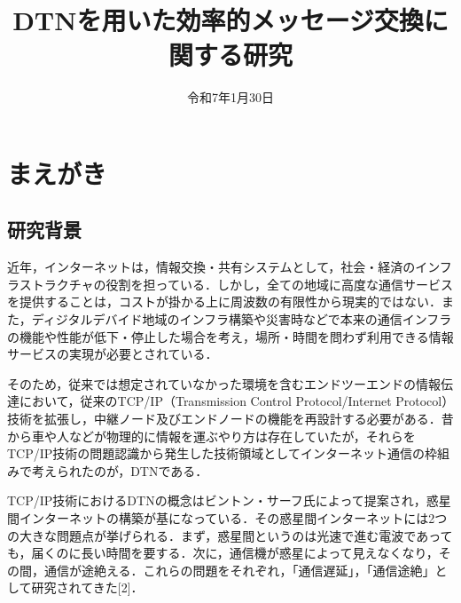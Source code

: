 \documentclass[11pt]{icsthesis}
\title{DTNを用いた効率的メッセージ交換に関する研究}
\date{令和7年1月30日}
\begin{document}
\maketitle
\pagestyle{fancy}
\fancyhead[R]{\nouppercase{\fontsize{10.5pt}{0pt}\selectfont\rightmark}}
\fancyhead[L]{\nouppercase{\fontsize{10.5pt}{0pt}\selectfont\leftmark}}
\fancyfoot[C]{--\ \thepage\ --}
\renewcommand{\headrulewidth}{0.3truemm}
\setcounter{tocdepth}{4}
\pagestyle{fancy}
\fancyfoot[C]{--\ \thepage\ --}
{\makeatletter
\let\ps@jpl@in\ps@empty
\makeatother
\pagestyle{plain}
\tableofcontents
\clearpage}

\chapter{まえがき}
\section{研究背景}
近年，インターネットは，情報交換・共有システムとして，社会・経済のインフラストラクチャの役割を担っている．しかし，全ての地域に高度な通信サービスを提供することは，コストが掛かる上に周波数の有限性から現実的ではない．また，ディジタルデバイド地域のインフラ構築や災害時などで本来の通信インフラの機能や性能が低下・停止した場合を考え，場所・時間を問わず利用できる情報サービスの実現が必要とされている．

そのため，従来では想定されていなかった環境を含むエンドツーエンドの情報伝達において，従来のTCP/IP（Transmission Control Protocol/Internet Protocol）技術を拡張し，中継ノード及びエンドノードの機能を再設計する必要がある．昔から車や人などが物理的に情報を運ぶやり方は存在していたが，それらをTCP/IP技術の問題認識から発生した技術領域としてインターネット通信の枠組みで考えられたのが，DTNである．

TCP/IP技術におけるDTNの概念はビントン・サーフ氏によって提案され，惑星間インターネットの構築が基になっている．その惑星間インターネットには2つの大きな問題点が挙げられる．まず，惑星間というのは光速で進む電波であっても，届くのに長い時間を要する．次に，通信機が惑星によって見えなくなり，その間，通信が途絶える．これらの問題をそれぞれ，「通信遅延」，「通信途絶」として研究されてきた[2]．
\end{document}
